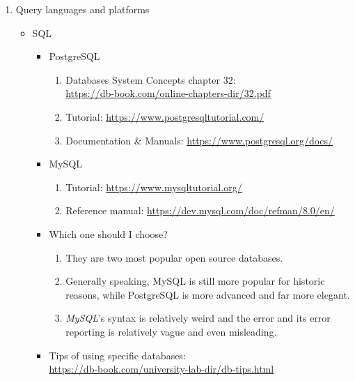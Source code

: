 \documentclass{article}
\begin{document}
\begin{enumerate}
    \item Query languages and platforms
    \begin{itemize}
        \item SQL
        \begin{itemize}
            \item PostgreSQL
            \begin{enumerate}
                \item Databases System Concepts chapter 32:\\
                \href{https://db-book.com/online-chapters-dir/32.pdf}{https://db-book.com/online-chapters-dir/32.pdf}
                \item Tutorial:
                \href{https://www.postgresqltutorial.com/}{https://www.postgresqltutorial.com/}
                \item Documentation \& Manuals:
                \href{https://www.postgresql.org/docs/}{https://www.postgresql.org/docs/}
            \end{enumerate}     
            \item MySQL
            \begin{enumerate}
                \item Tutorial:
                \href{https://www.mysqltutorial.org/}{https://www.mysqltutorial.org/}
                \item Reference manual:
                \href{https://dev.mysql.com/doc/refman/8.0/en/}{https://dev.mysql.com/doc/refman/8.0/en/}
            \end{enumerate}
            \item Which one should I choose?
            \begin{enumerate}
                \item They are two most popular open source databases.
                \item Generally speaking, MySQL is still more popular for historic reasons, while PostgreSQL is more advanced and far more elegant.
                \item \emph{MySQL}'s syntax is relatively weird and the error and its error reporting is relatively vague and even misleading.
            \end{enumerate}
            \item Tips of using specific databases:\\
            \href{https://db-book.com/university-lab-dir/db-tips.html}{https://db-book.com/university-lab-dir/db-tips.html}
        \end{itemize}

\end{itemize}
\end{enumerate}
\end{document}

